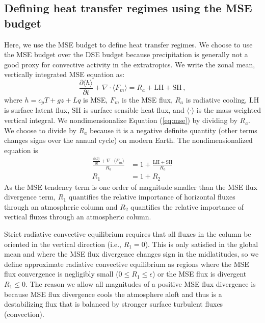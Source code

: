 \documentclass{ametsocV5}
\begin{document}
\subsection{Defining heat transfer regimes using the MSE budget}

    Here, we use the MSE budget to define heat transfer regimes. We choose to use the MSE budget over the DSE budget because precipitation is generally not a good proxy for convective activity in the extratropics. We write the zonal mean, vertically integrated MSE equation as: 
    \begin{equation} \label{eq:mse}
        \frac{\partial \langle h \rangle}{\partial t} + \nabla\cdot \langle F_{m} \rangle = R_{a} + \mathrm{LH+SH} \, ,
    \end{equation}
    where $h=c_p T + gz + Lq$ is MSE, $F_m$ is the MSE flux, $R_a$ is radiative cooling, $\mathrm{LH}$ is surface latent flux, $\mathrm{SH}$ is surface sensible heat flux, and $\langle \cdot \rangle$ is the mass-weighted vertical integral. We nondimensionalize Equation (\ref{eq:mse}) by dividing by \(R_{a}\). We choose to divide by $R_a$ because it is a negative definite quantity (other terms changes signs over the annual cycle) on modern Earth. The nondimensionalized equation is
    \begin{align}
        \frac{\frac{\partial \langle h \rangle}{\partial t} + \nabla\cdot \langle F_{m} \rangle }{R_{a}} &= 1 + \frac{\mathrm{LH+SH}}{R_{a}} \\
        R_{1} &= 1 + R_{2}
    \end{align}
    As the MSE tendency term is one order of magnitude smaller than the MSE flux divergence term, \(R_{1}\) quantifies the relative importance of horizontal fluxes through an atmospheric column and \(R_{2}\) quantifies the relative importance of vertical fluxes through an atmospheric column.
    
    Strict radiative convective equilibrium requires that all fluxes in the column be oriented in the vertical direction (i.e., \(R_{1}=0\)). This is only satisfied in the global mean and where the MSE flux divergence changes sign in the midlatitudes, so we define approximate radiative convective equilibrium as regions where the MSE flux convergence is negligibly small (\(0 \le R_{1} \le \epsilon\)) or the MSE flux is divergent \(R_{1}\le 0\). The reason we allow all magnitudes of a positive MSE flux divergence is because MSE flux divergence cools the atmosphere aloft and thus is a destabilizing flux that is balanced by stronger surface turbulent fluxes (convection).
    
\end{document}
